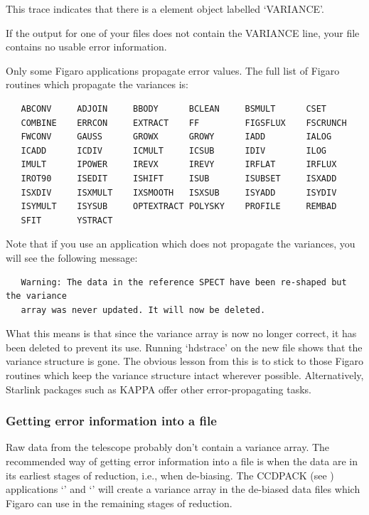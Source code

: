 This trace indicates that there is a 
element object labelled `VARIANCE'.

If the output for one of your files does not contain the VARIANCE line,
your file contains no usable error information.

Only some Figaro applications propagate error values.  The full list of
Figaro routines which propagate the variances is:

\begin{verbatim}
   ABCONV     ADJOIN     BBODY      BCLEAN     BSMULT      CSET
   COMBINE    ERRCON     EXTRACT    FF         FIGSFLUX    FSCRUNCH
   FWCONV     GAUSS      GROWX      GROWY      IADD        IALOG
   ICADD      ICDIV      ICMULT     ICSUB      IDIV        ILOG
   IMULT      IPOWER     IREVX      IREVY      IRFLAT      IRFLUX
   IROT90     ISEDIT     ISHIFT     ISUB       ISUBSET     ISXADD
   ISXDIV     ISXMULT    IXSMOOTH   ISXSUB     ISYADD      ISYDIV
   ISYMULT    ISYSUB     OPTEXTRACT POLYSKY    PROFILE     REMBAD
   SFIT       YSTRACT
\end{verbatim}

Note that if you use an application which does not propagate the
variances, you will see the following message:

{\small
\begin{verbatim}
   Warning: The data in the reference SPECT have been re-shaped but the variance
   array was never updated. It will now be deleted.
\end{verbatim}
}

What this means is that since the variance array is now no longer correct,
it has been deleted to prevent its use.
Running `hdstrace' on the new file shows that the variance structure is gone.
The obvious lesson from this is to stick to those Figaro
routines which keep the
variance structure intact wherever possible. Alternatively, Starlink
packages such as KAPPA offer other error-propagating tasks.

\subsubsection{Getting error information into a file}

Raw data from the telescope probably don't contain a variance array.
The recommended way of getting error information into a file is when the
data are in its earliest stages of reduction, i.e., when de-biasing. The
CCDPACK (see ) applications 
`' and `'
will create a variance array in the de-biased data files which Figaro can
use in the remaining stages of reduction.

